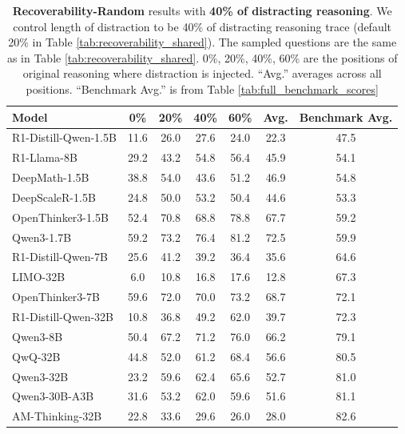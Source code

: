 \documentclass{article} %
\begin{document}
\begin{table}[ht!]
  \centering
  \begin{tabular}{lccccc|c}
    \toprule
    \textbf{Model} & \textbf{0\%} & \textbf{20\%} & \textbf{40\%} & \textbf{60\%} & \textbf{Avg.} & \textbf{Benchmark Avg.} \\
    \midrule
    R1-Distill-Qwen-1.5B    & 11.6 & 26.0 & 27.6 & 24.0 & 22.3 & 47.5 \\
    R1-Llama-8B             & 29.2 & 43.2 & 54.8 & 56.4 & 45.9 & 54.1 \\
    DeepMath-1.5B           & 38.8 & 54.0 & 43.6 & 51.2 & 46.9 & 54.8 \\
    DeepScaleR-1.5B         & 24.8 & 50.0 & 53.2 & 50.4 & 44.6 & 53.3 \\
    OpenThinker3-1.5B       & 52.4 & 70.8 & 68.8 & 78.8 & 67.7 & 59.2 \\
    Qwen3-1.7B              & 59.2 & 73.2 & 76.4 & 81.2 & 72.5 & 59.9 \\
    \midrule
    R1-Distill-Qwen-7B      & 25.6 & 41.2 & 39.2 & 36.4 & 35.6 & 64.6 \\
    LIMO-32B                & 6.0 & 10.8 & 16.8 & 17.6 & 12.8 & 67.3 \\
    OpenThinker3-7B         & 59.6 & 72.0 & 70.0 & 73.2 & 68.7 & 72.1 \\
    R1-Distill-Qwen-32B     & 10.8 & 36.8 & 49.2 & 62.0 & 39.7 & 72.3 \\
    \midrule
    Qwen3-8B                & 50.4 & 67.2 & 71.2 & 76.0 & 66.2 & 79.1 \\
    QwQ-32B                 & 44.8 & 52.0 & 61.2 & 68.4 & 56.6 & 80.5 \\
    Qwen3-32B               & 23.2 & 59.6 & 62.4 & 65.6 & 52.7 & 81.0 \\
    Qwen3-30B-A3B           & 31.6 & 53.2 & 62.0 & 59.6 & 51.6 & 81.1 \\
    AM-Thinking-32B      & 22.8 & 33.6 & 29.6 & 26.0 & 28.0 & 82.6 \\
    \bottomrule
  \end{tabular}
  \caption{\textbf{Recoverability-Random} results with \textbf{40\% of distracting reasoning}. We control length of distraction to be 40\% of distracting reasoning trace (default 20\% in Table \ref{tab:recoverability_shared}). The sampled questions are the same as in Table \ref{tab:recoverability_shared}. 0\%, 20\%, 40\%, 60\% are the positions of original reasoning where distraction is injected. ``Avg.'' averages across all positions. ``Benchmark Avg.'' is from Table \ref{tab:full_benchmark_scores}}
  \label{tab:recoverability_individial_40percent}
\end{table}
\end{document}
